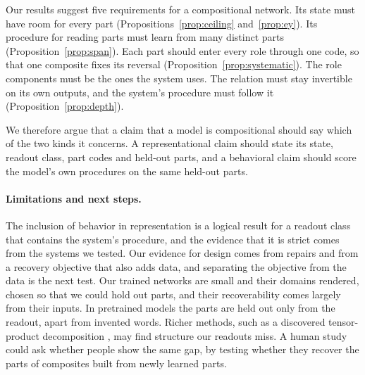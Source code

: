 Our results suggest five requirements for a compositional network. Its state must have room for every part (Propositions~\ref{prop:ceiling} and~\ref{prop:ey}). Its procedure for reading parts must learn from many distinct parts (Proposition~\ref{prop:span}). Each part should enter every role through one code, so that one composite fixes its reversal (Proposition~\ref{prop:systematic}). The role components must be the ones the system uses. The relation must stay invertible on its own outputs, and the system's procedure must follow it (Proposition~\ref{prop:depth}).

We therefore argue that a claim that a model is compositional should say which of the two kinds it concerns. A representational claim should state its state, readout class, part codes and held-out parts, and a behavioral claim should score the model's own procedures on the same held-out parts.

\paragraph{Limitations and next steps.} The inclusion of behavior in representation is a logical result for a readout class that contains the system's procedure, and the evidence that it is strict comes from the systems we tested. Our evidence for design comes from repairs and from a recovery objective that also adds data, and separating the objective from the data is the next test. Our trained networks are small and their domains rendered, chosen so that we could hold out parts, and their recoverability comes largely from their inputs. In pretrained models the parts are held out only from the readout, apart from invented words. Richer methods, such as a discovered tensor-product decomposition \citep{mccoy2019}, may find structure our readouts miss. A human study could ask whether people show the same gap, by testing whether they recover the parts of composites built from newly learned parts.
